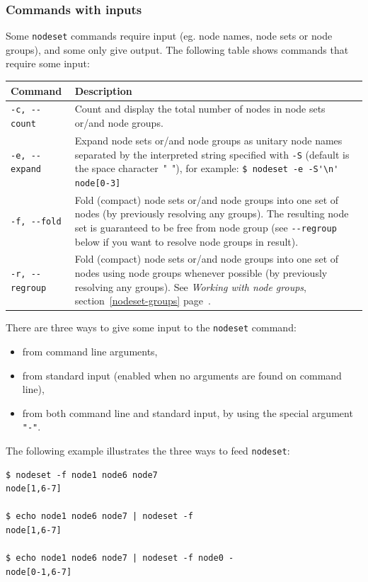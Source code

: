 \documentclass[english,a4paper]{csuserguide}
\newcommand{\nodeset}{\texttt{nodeset}\xspace}
\begin{document}
\subsubsection{Commands with inputs}

Some  \nodeset commands require input (eg. node names, node sets or node groups), and some only give output. The following table shows commands that require some input:

\begin{center}
\label{nodeset-cmds}
\begin{tabular}{|p{3.2cm}|p{13.2cm}|} 
\hline 
\textbf{Command} & \textbf{Description} \\
\hline
\verb+-c, --count+& Count and display the total number of nodes in node sets or/and node groups.\\
\hline
\verb+-e, --expand+ & Expand node sets or/and node groups as unitary node names separated by the interpreted string specified with \verb+-S+ (default is the space character\mbox{ " "}), for example:
\lstinline+$ nodeset -e -S'\n' node[0-3]+\\
\hline
\verb+-f, --fold+ & Fold (compact) node sets or/and node groups into one set of nodes (by previously resolving any groups). The resulting node set is guaranteed to be free from node group (see \verb+--regroup+ below if you want to resolve node groups in result).\\
\hline
\verb+-r, --regroup+ & Fold (compact) node sets or/and node groups into one set of nodes using node groups whenever possible (by previously resolving any groups). See \textit{Working with node groups}, section~\ref{nodeset-groups} page~\pageref{nodeset-groups}.\\
\hline
\end{tabular}
\end{center}


There are three ways to give some input to the \nodeset command:
\begin{itemize}
\item{from command line arguments,}
\item{from standard input (enabled when no arguments are found on command line),}
\item{from both command line and standard input, by using the special argument \verb+"-"+.}
\end{itemize}

The following example illustrates the three ways to feed \nodeset:
\bigskip

\begin{lstlisting}[breaklines=true, breakatwhitespace=true] 
$ nodeset -f node1 node6 node7
node[1,6-7]

$ echo node1 node6 node7 | nodeset -f
node[1,6-7]

$ echo node1 node6 node7 | nodeset -f node0 -
node[0-1,6-7]
\end{lstlisting}
\end{document}
